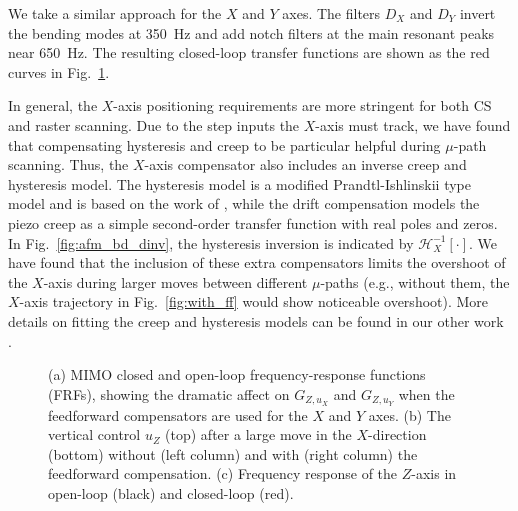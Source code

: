 \documentclass[journal]{IEEEtran}
\begin{document}
We take a similar approach for the $X$ and $Y$ axes. The filters $D_X$
and $D_Y$ invert the bending modes at 350~Hz and add notch filters at
the main resonant peaks near 650~Hz. The resulting closed-loop
transfer functions are shown as the red curves in
Fig.~\ref{fig:mimo_frf_uxuy}.

In general, the $X$-axis positioning requirements are more stringent
for both CS and raster scanning. Due to the step inputs the $X$-axis
must track, we have found that compensating hysteresis and creep to be
particular helpful during $\mu$-path scanning. Thus, the $X$-axis
compensator also includes an inverse creep and hysteresis model. The
hysteresis model is a modified Prandtl-Ishlinskii type model and is
based on the work of \cite{kuhnen_modeling_2003}, while the drift
compensation models the piezo creep as a simple second-order transfer
function with real poles and zeros. In Fig.~\ref{fig:afm_bd_dinv}, the
hysteresis inversion is indicated by $\mathcal{H}_X^{-1}[\cdot]$. We
have found that the inclusion of these extra compensators limits the
overshoot of the $X$-axis during larger moves between different
$\mu$-paths (e.g., without them, the $X$-axis trajectory in
Fig.~\ref{fig:with_ff} would show noticeable overshoot). More details
on fitting the creep and hysteresis models can be found in our other
work \cite{braker_afmmpc_2019}.

\begin{figure}
  \centering
  \begin{subfigure}[b]{.65\textwidth}
    
    \caption{}\label{fig:mimo_frf_uxuy}
  \end{subfigure}\hfill
  \begin{subfigure}[b]{.34\textwidth}
    
    \caption{}\label{fig:with_ff}
    \vspace{2ex}
    
    \caption{}\label{fig:z_control}
  \end{subfigure}
  \caption{(a) MIMO closed and open-loop frequency-response functions (FRFs), showing the dramatic
    affect on $G_{Z,u_X}$ and $G_{Z,u_Y}$ when the feedforward
    compensators are used for the $X$ and $Y$ axes. (b) The vertical
    control $u_Z$ (top) after a large move in the $X$-direction
    (bottom) without (left column) and with (right column) the
    feedforward compensation. (c) Frequency response of the $Z$-axis
    in open-loop (black) and closed-loop (red). }
\end{figure}
\end{document}
